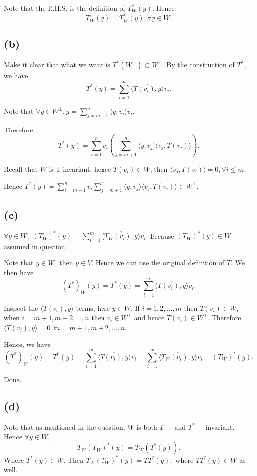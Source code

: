 \documentclass[12pt]{article}%
\begin{document}
Note that the R.H.S. is the definition of $T_W^*(y).$ Hence $$T_W(y)=T_W^*(y), \forall y \in W.$$

\subsection{(b)}
Make it clear that what we want is $T^*(W^\perp) \subset W^\perp.$ By the construction of $T^*,$ we have 
$$T^*(y)=\sum_{i=1}^n \overline{\langle T(v_i),y \rangle} v_i.$$

Note that $\forall y \in W^{\perp}, y=\sum_{j=m+1}^n \langle y,v_i \rangle v_i.$

Therefore $$T^*(y)=\sum_{i=1}^n v_i (\sum_{j=m+1}^n \langle y,v_j \rangle \langle v_j, T(v_i) \rangle ).$$

Recall that $W$ is T-invariant, hence $T(v_i) \in W$, then $\langle v_j, T(v_i) \rangle=0, \forall i\leq m.$

Hence $T^*(y)=\sum_{i=m+1}^n v_i \sum_{j=m+1}^n \langle y,v_j \rangle \langle v_j, T(v_i) \rangle  \in W^{\perp}.$

\subsection{(c)}
$\forall y \in W,$ $(T_W)^*(y)=\sum_{i=1}^m \overline{\langle T_W(v_i),y \rangle} v_i.$ Because $(T_W)^*(y) \in W$ assumed in question.

Note that $y \in W, $ then $y \in V.$ Hence we can use the original definition of $T.$ We then have
$$(T^*)_W(y)=T^*(y)=\sum_{i=1}^n \overline{\langle T(v_i),y \rangle} v_i.$$

Inspect the $\langle T(v_i),y \rangle$ terms, here $y \in W$. If $i=1,2,\dots,m$ then $T(v_i) \in W,$ when 
$i=m+1,m+2,\dots,n$ then $v_i \in W^{\perp}$ and hence $T(v_i) \in W^{\perp}.$ Therefore 
$\langle T(v_i),y \rangle =0, \forall i=m+1,m+2,\dots,n.$

Hence, we have $$(T^*)_W(y)=T^*(y)=\sum_{i=1}^m \overline{\langle T(v_i),y \rangle} v_i=\sum_{i=1}^m \overline{\langle T_W(v_i),y \rangle} v_i=(T_W)^*(y).$$

Done.

\subsection{(d)}
Note that as mentioned in the question, $W$ is both $T-$ and $T^*-$ invariant.
Hence $\forall y \in W,$ $$T_W (T_W)^* (y)=T_W(T^*(y)).$$ 
Where $T^*(y) \in W.$ Then $T_W (T_W)^* (y)=TT^*(y),$ where $TT^*(y) \in W$ as well.
\end{document}
